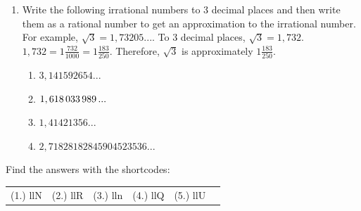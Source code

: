 \begin{enumerate}[noitemsep, label=\textbf{\arabic*}. ]
        \label{m38349*uid44}\item Write the following irrational numbers to 3 decimal places and then write them as a rational number to get an approximation to the irrational number. For example, $\sqrt{3}=1,73205...$. To 3 decimal places, \begin{math}\sqrt{3}=1,732\end{math}. \begin{math}1,732=1\frac{732}{1000}=1\frac{183}{250}\end{math}. Therefore, \begin{math}\sqrt{3}\end{math} is approximately \begin{math}1\frac{183}{250}\end{math}.
\label{m38349*id326443}\begin{enumerate}[noitemsep, label=\textbf{\alph*}. ] 
            \label{m38349*uid45}\item $3,141592654...$\label{m38349*uid46}\item \begin{math}1,618\phantom{\rule{0.166667em}{0ex}}033\phantom{\rule{0.166667em}{0ex}}989\phantom{\rule{0.166667em}{0ex}}...\end{math}\label{m38349*uid47}\item \begin{math}1,41421356...\end{math}\label{m38349*uid48}\item \begin{math}2,71828182845904523536...\end{math}\end{enumerate}
        \end{enumerate}
  \label{m38349**end}
\par {} Find the answers with the shortcodes:
 \par \begin{tabular}[h]{cccccc}
 (1.) llN  &  (2.) llR  &  (3.) lln  &  (4.) llQ  &  (5.) llU  & \end{tabular}
